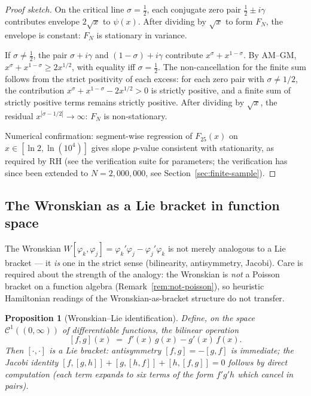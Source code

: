 \documentclass[11pt,a4paper]{article}
\theoremstyle{plain}
\newtheorem{proposition}[theorem]{Proposition}
\theoremstyle{definition}
\theoremstyle{remark}
\begin{document}
\begin{proof}[Proof sketch]
On the critical line $\sigma = \tfrac{1}{2}$, each conjugate zero pair 
$\tfrac{1}{2} \pm i\gamma$ contributes envelope $2\sqrt{x}$ to $\psi(x)$.  
After dividing by $\sqrt{x}$ to form $F_N$, the envelope is constant: 
$F_N$ is stationary in variance.

If $\sigma \neq \tfrac{1}{2}$, the pair $\sigma + i\gamma$ and 
$(1-\sigma) + i\gamma$ contribute $x^\sigma + x^{1-\sigma}$.  
By AM--GM, $x^\sigma + x^{1-\sigma} \geq 2x^{1/2}$, with equality 
iff $\sigma = \tfrac{1}{2}$.  The non-cancellation for the finite sum
follows from the strict positivity of each excess:
for each zero pair with $\sigma \neq 1/2$, the contribution
$x^\sigma + x^{1-\sigma} - 2x^{1/2} > 0$ is strictly positive,
and a finite sum of strictly positive terms remains strictly positive.
After dividing by $\sqrt{x}$, the 
residual $x^{|\sigma - 1/2|} \to \infty$: $F_N$ is non-stationary.

Numerical confirmation: segment-wise regression of $F_{25}(x)$ on 
$x \in [\ln 2, \ln(10^4)]$ gives slope $p$-value consistent 
with stationarity, as required by RH
(see the verification suite for parameters; the verification has
since been extended to $N = 2{,}000{,}000$, see
Section~\ref{sec:finite-sample}).
\end{proof}

\subsection{The Wronskian as a Lie bracket in function space}

The Wronskian $W[\varphi_k, \varphi_j] = \varphi_k'\varphi_j - \varphi_j'\varphi_k$
is not merely analogous to a Lie bracket --- it \emph{is} one in the
strict sense (bilinearity, antisymmetry, Jacobi).  Care is required
about the strength of the analogy: the Wronskian is \emph{not} a
Poisson bracket on a function algebra (Remark~\ref{rem:not-poisson}),
so heuristic Hamiltonian readings of the Wronskian-as-bracket structure
do not transfer.

\begin{proposition}[Wronskian--Lie identification]\label{prop:wronski-lie}
Define, on the space $\mathcal{C}^1((0,\infty))$ of differentiable functions,
the bilinear operation
\[
  [f,g](x) \;=\; f'(x)\,g(x) - g'(x)\,f(x).
\]
Then $[\cdot,\cdot]$ is a Lie bracket:
antisymmetry $[f,g] = -[g,f]$ is immediate; the Jacobi identity
$[f,[g,h]] + [g,[h,f]] + [h,[f,g]] = 0$ follows by direct computation
(each term expands to six terms of the form $f'g'h$ which cancel in pairs).
\end{proposition}
\end{document}
